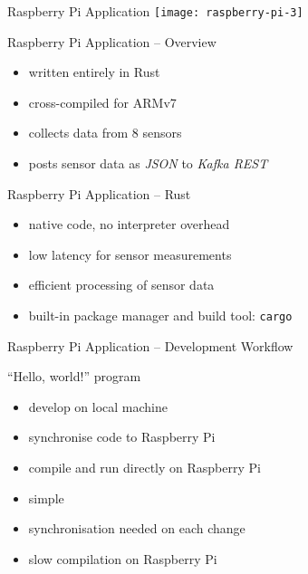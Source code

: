 \begin{frame}{Raspberry Pi Application}
 \centering
 \vspace*{1em}
 \texttt{[image: raspberry-pi-3]}
\end{frame}

\begin{frame}{Raspberry Pi Application -- Overview}
  \begin{itemize}
    \item written entirely in Rust
    \item cross-compiled for ARMv7
    \item collects data from 8 sensors
    \item posts sensor data as \textit{JSON} to \textit{Kafka REST}
  \end{itemize}
\end{frame}

\begin{frame}{Raspberry Pi Application -- Rust}
  \begin{itemize}
    \item native code, no interpreter overhead
    \item low latency for sensor measurements
    \item efficient processing of sensor data
    \item built-in package manager and build tool: \texttt{cargo}
  \end{itemize}
\end{frame}

\begin{frame}{Raspberry Pi Application -- Development Workflow}
  \begin{block}{“Hello, world!” program}
    \begin{itemize}
      \item develop on local machine
      \item synchronise code to Raspberry Pi
      \item compile and run directly on Raspberry Pi
    \end{itemize}
  \end{block}
  \begin{block}{}
    \begin{itemize}
      \item simple
    \end{itemize}
  \end{block}
  \begin{block}{}
    \begin{itemize}
      \item synchronisation needed on each change
      \item slow compilation on Raspberry Pi
    \end{itemize}
  \end{block}
\end{frame}

